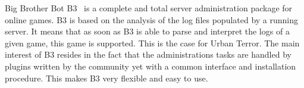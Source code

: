 %   
%
%
%
%

Big Brother Bot B3~\cite{b3} is a complete and total server administration
package for online games. 
B3 is based on the analysis of the log files populated by a running server. 
It means that as soon as B3 is able to parse and interpret the logs of a given
game, this game is supported. This is the case for Urban Terror. 
The main interest of B3 resides in the fact that the administrations tasks are
handled by plugins written by the community yet with a common interface and
installation procedure. This makes B3 very flexible and easy to use. 

